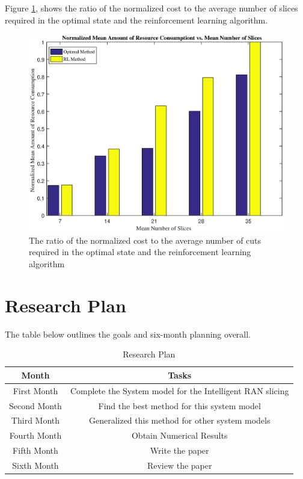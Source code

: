 \documentclass{article}
\begin{document}
Figure \ref{fig:consumptionE}, shows the ratio of the normalized cost to the average number of slices required in the optimal state and the reinforcement learning algorithm.
\begin{figure}[H]
	\centering
	\includegraphics[scale = 0.4]{./fig/consumptionE} %
	\caption{  The ratio of the normalized cost to the average number of cuts required in the optimal state and the reinforcement learning algorithm }
	\label{fig:consumptionE}
\end{figure}
\section{Research Plan}
The table below outlines the goals and six-month planning overall.
\begin{table}
 \caption {Research Plan} \label{table:1a}
 \begin{center}
  \begin{tabular}{||c c ||}
  \hline
Month & Tasks \\ [0.5ex]
  \hline\hline
  First Month & Complete the System model for the Intelligent RAN slicing\\
  \hline
  Second Month & Find the best method for this system model \\
  \hline
  Third Month & Generalized this method for other system models \\
  \hline
    Fourth Month & Obtain Numerical Results\\
  \hline
    Fifth Month & Write the paper\\
  \hline
      Sixth Month & Review the paper\\
  \hline
 \end{tabular}
 \end{center}
 \end{table}

 




\vspace{20mm}
\end{document}
